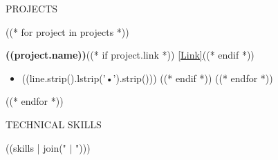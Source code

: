 \documentclass[9pt]{resume}
\begin{document}
\vspace{-0.90em}
\begin{rSection}{PROJECTS}
\vspace{-0.95em}

((* for project in projects *))
\vspace{-0.25em}
\item \textbf{((project.name))}((* if project.link *)) \href{((project.link))}{[Link]}((* endif *))
\begin{itemize}
\itemsep -1.75pt {}
((* for line in project.description.split('\n') *))
((* if line.strip() *))
    \item ((line.strip().lstrip('•').strip()))
((* endif *))
((* endfor *))
\end{itemize}

((* endfor *))
\end{rSection}

\vspace{-0.90em}
\begin{rSection}{TECHNICAL SKILLS}
\vspace{-0.35em}

((skills | join(" $|$ ")))

\end{rSection}
\end{document}
